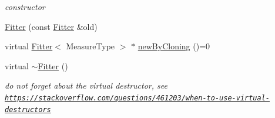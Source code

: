 \begin{DoxyCompactItemize}
\begin{DoxyCompactList}\small\item\em constructor \end{DoxyCompactList}\item 
\hyperlink{class_ox_1_1_fitter_ac51130b722159f88a0dad59877b76417}{Fitter} (const \hyperlink{class_ox_1_1_fitter}{Fitter} \&old)
\item 
virtual \hyperlink{class_ox_1_1_fitter}{Fitter}$<$ Measure\-Type $>$ $\ast$ \hyperlink{class_ox_1_1_fitter_a665ec51e52ed351c9ef801acc83fbdea}{new\-By\-Cloning} ()=0
\item 
\hypertarget{class_ox_1_1_fitter_ab56eef37096f6f0687d83b8d15e00d43}{virtual \hyperlink{class_ox_1_1_fitter_ab56eef37096f6f0687d83b8d15e00d43}{$\sim$\-Fitter} ()}\label{class_ox_1_1_fitter_ab56eef37096f6f0687d83b8d15e00d43}

\begin{DoxyCompactList}\small\item\em do not forget about the virtual destructor, see \href{https://stackoverflow.com/questions/461203/when-to-use-virtual-destructors}{\tt https\-://stackoverflow.\-com/questions/461203/when-\/to-\/use-\/virtual-\/destructors} \end{DoxyCompactList}\end{DoxyCompactItemize}
